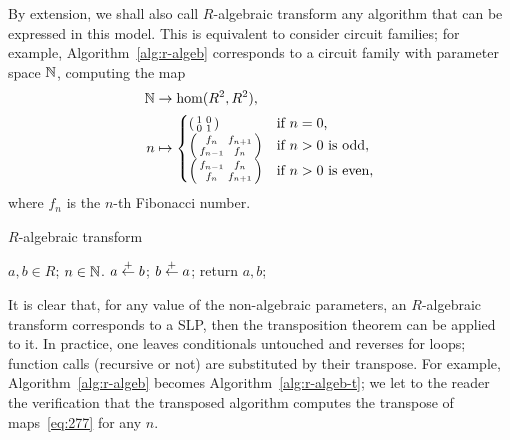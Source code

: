 By extension, we shall also call $R$-algebraic transform any algorithm
that can be expressed in this model. This is equivalent to consider
circuit families; for example, Algorithm~\ref{alg:r-algeb} corresponds
to a circuit family with parameter space $\mathbb{N}$, computing the map
\begin{equation}
  \label{eq:277}
  \begin{aligned}
    \mathbb{N} &\rightarrow\hom(R^2,R^2)\text{,}\\
    n &\mapsto
    \begin{cases}
      \left(\begin{smallmatrix}1&0\\0&1\end{smallmatrix}\right) &\text{if $n=0$,}\\
      \left(\begin{smallmatrix}f_n&f_{n+1}\\f_{n-1}&f_n\end{smallmatrix}\right) &\text{if $n>0$ is odd,}\\
      \left(\begin{smallmatrix}f_{n-1}&f_n\\f_n&f_{n+1}\end{smallmatrix}\right) &\text{if $n>0$ is even,}
    \end{cases}
  \end{aligned}
\end{equation}
where $f_n$ is the $n$-th Fibonacci number.

\begin{algorithm}
  \caption{\label{alg:r-algeb}$R$-algebraic transform}
  \begin{algorithmic}
    \REQUIRE $a,b\in R$; $n\in\mathbb{N}$.
    \STATE $a \overset{+}{\leftarrow} b$;
    \ELSE
    \STATE $b \overset{+}{\leftarrow} a$;
    \ENDIF
    \ENDFOR
    \STATE return $a,b$;
  \end{algorithmic}
\end{algorithm}


It is clear that, for any value of the non-algebraic parameters, an
$R$-algebraic transform corresponds to a SLP, then the transposition
theorem can be applied to it. In practice, one leaves conditionals
untouched and reverses for loops; function calls (recursive or not)
are substituted by their transpose. For example,
Algorithm~\ref{alg:r-algeb} becomes Algorithm~\ref{alg:r-algeb-t}; we
let to the reader the verification that the transposed algorithm
computes the transpose of maps~\eqref{eq:277} for any $n$.

